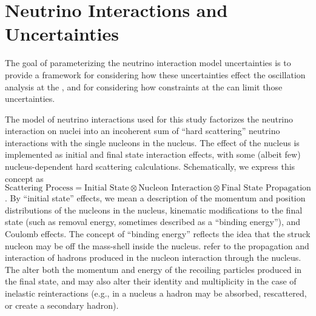 \section{Neutrino Interactions and Uncertainties}\label{sec:nu-osc-05} %


 
The goal of parameterizing the neutrino interaction model uncertainties is to provide a framework for considering how these uncertainties effect the oscillation analysis at the , and for considering how constraints at the  can limit those uncertainties.
 
The model of neutrino interactions used for this study factorizes the neutrino
interaction on nuclei into an incoherent sum of ``hard scattering'' neutrino interactions with the single nucleons in the nucleus. The effect of the nucleus is implemented as
initial and final state interaction effects, with some (albeit few) nucleus-dependent hard scattering calculations. Schematically, we express this concept as $\text{Scattering Process} = \text{Initial State} \otimes \text{Nucleon Interaction} \otimes \text{Final State Propagation}$.  By ``initial state'' effects, we  mean a description of the momentum and position distributions of the nucleons in the nucleus, kinematic modifications to the final state (such as removal energy, sometimes described as a ``binding energy''), and Coulomb effects.   The concept of ``binding energy'' reflects the idea that the struck nucleon may be off the mass-shell inside the nucleus.   %
refer to the propagation and interaction of hadrons produced in the nucleon interaction through the nucleus. The  alter both the momentum and energy of the recoiling particles produced in the final state, and may also alter their identity and multiplicity in the case of inelastic reinteractions (e.g., in a nucleus a hadron may be absorbed, rescattered, or create a secondary hadron). 

